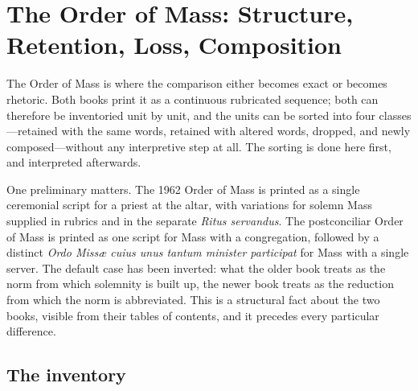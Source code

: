 \section{The Order of Mass: Structure, Retention, Loss, Composition}

The Order of Mass is where the comparison either becomes exact or becomes rhetoric. Both books print it as a continuous rubricated sequence; both can therefore be inventoried unit by unit, and the units can be sorted into four classes---retained with the same words, retained with altered words, dropped, and newly composed---without any interpretive step at all. The sorting is done here first, and interpreted afterwards.

One preliminary matters. The 1962 Order of Mass is printed as a single ceremonial script for a priest at the altar, with variations for solemn Mass supplied in rubrics and in the separate \emph{Ritus servandus}. The postconciliar Order of Mass is printed as one script for Mass with a congregation, followed by a distinct \emph{Ordo Missæ cuius unus tantum minister participat} for Mass with a single server. The default case has been inverted: what the older book treats as the norm from which solemnity is built up, the newer book treats as the reduction from which the norm is abbreviated. This is a structural fact about the two books, visible from their tables of contents, and it precedes every particular difference.

\subsection{The inventory}

